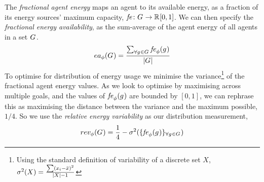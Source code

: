 \newcommand{\functionEnergyAvailable}[2]{
	\ifx \\#1\\
	\functionSignature{ea_{\varTime{}{}}}{\setAgents{}{}}
	\else
	\functionSignature{ea_{\varTime{}{}}}{#1}
	\fi
}
The \textit{fractional agent energy} maps an agent to its available energy, as a fraction of its energy sources' maximum capacity, $\formalAgentEnergyAvailable{}{}$. We can then specify the \textit{fractional energy availability}, as the sum-average of the agent energy of all agents in a set $G_{}^{}$.
\begin{equation}
	\functionEnergyAvailable{}{} 
	= \dfrac{\sum_{\forall \varAgent{}{} \in \setAgents{}{}} \functionAgentEnergyAvailable{\varAgent{i}{}}{}}
	{\funcSize{\setAgents{}{}}}
\end{equation}
To optimise for distribution of energy usage we minimise the variance\footnote{Using the standard definition of variability of a discrete set $X$, $\sigma^2(X) = \frac{\sum (x_i - \bar{x})^2}{\lvert X \rvert-1}$} of the fractional agent energy values. As we look to optimise by maximising across multiple goals, and the values of $\functionAgentEnergyAvailable{}{}$ are bounded by $[0, 1]$, we can rephrase this as maximising the distance between the variance and the maximum possible, $1/4$. So we use the \textit{relative energy variability} as our distribution measurement,
\begin{equation}     	
	\functionEnergyVariability{}{} 
	= \frac{1}{4} - \sigma^2(
	\lbrace \functionAgentEnergyAvailable{}{}
	\rbrace_{\forall \varAgent{}{} \in \setAgents{}{}}
	)
\end{equation}


